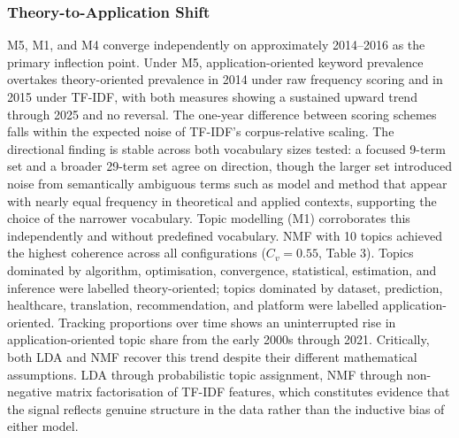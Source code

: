 \subsubsection{Theory-to-Application Shift}
M5, M1, and M4 converge independently on approximately 2014–2016 as the primary inflection point. Under M5, application-oriented keyword prevalence overtakes theory-oriented prevalence in 2014 under raw frequency scoring and in 2015 under TF-IDF, with both measures showing a sustained upward trend through 2025 and no reversal. The one-year difference between scoring schemes falls within the expected noise of TF-IDF's corpus-relative scaling. The directional finding is stable across both vocabulary sizes tested: a focused 9-term set and a broader 29-term set agree on direction, though the larger set introduced noise from semantically ambiguous terms such as model and method that appear with nearly equal frequency in theoretical and applied contexts, supporting the choice of the narrower vocabulary.
Topic modelling (M1) corroborates this independently and without predefined vocabulary. NMF with 10 topics achieved the highest coherence across all configurations ($C_v = 0.55$, Table 3). Topics dominated by algorithm, optimisation, convergence, statistical, estimation, and inference were labelled theory-oriented; topics dominated by dataset, prediction, healthcare, translation, recommendation, and platform were labelled application-oriented. Tracking proportions over time shows an uninterrupted rise in application-oriented topic share from the early 2000s through 2021. Critically, both LDA and NMF recover this trend despite their different mathematical assumptions. LDA through probabilistic topic assignment, NMF through non-negative matrix factorisation of TF-IDF features, which constitutes evidence that the signal reflects genuine structure in the data rather than the inductive bias of either model.

